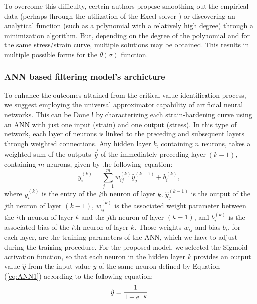 \documentclass[metals,article,submit,pdftex,moreauthors]{Definitions/mdpi}
\DeclareRobustCommand{\e}[1]{{\rm e}^{#1}}
\DeclareRobustCommand{\lay}[1]{^{(#1)}}
\begin{document}
To overcome this difficulty, certain authors propose smoothing out the empirical data (perhaps through the utilization of the Excel solver \cite{Najafizadeh-2006}) or discovering an analytical function (such as a polynomial with a relatively high degree) through a minimization algorithm.
But, depending on the degree of the polynomial and for the same stress/strain curve, multiple solutions may be obtained.
This results in multiple possible forms for the $\theta(\sigma)$ function.

\subsubsection{ANN based filtering model's archicture \label{subsec:ANNbasics}}

To enhance the outcomes attained from the critical value identification process, we suggest employing the universal approximator capability of artificial neural networks.
This can be Done ! by characterizing each strain-hardening curve using an ANN with just one input (strain) and one output (stress).
In this type of network, each layer of neurons is linked to the preceding and subsequent layers through weighted connections.
Any hidden layer $k$, containing $n$ neurons, takes a weighted sum of the outputs $\overrightarrow{\hat{y}}$ of the immediately preceding layer $(k-1)$, containing $m$ neurons, given by the following~equation:
\begin{equation}
y_i\lay{k} = \sum_{j=1}^m w_{ij}\lay{k} \hat{y}_j^{(k-1)}+ b_i\lay{k},\label{eq:ANN1}
\end{equation}
where $y_i\lay{k}$ is the entry of the $i$th neuron of layer $k$, $\hat{y}_j\lay{k-1}$ is the output of the $j$th neuron of layer $(k-1)$, $w_{ij}\lay{k}$ is the associated weight parameter between the $i$th neuron of layer $k$ and the $j$th neuron of layer $(k-1)$, and $b_i\lay{k}$ is the associated bias of the $i$th neuron of layer $k$.
Those weights $w_{ij}$ and bias $b_i$, for each layer, are the training parameters of the ANN, which we have to adjust during the training procedure.
For the proposed model, we selected the Sigmoid activation function, so that each neuron in the hidden layer $k$ provides an output value ${\hat{y}}$ from the input value $y$ of the same neuron defined by Equation (\ref{eq:ANN1}) according to the following equation:
\begin{equation}
\hat{y}=\frac{1}{1 + \e{-y}}\label{eq:ANN2}
\end{equation}
\end{document}
